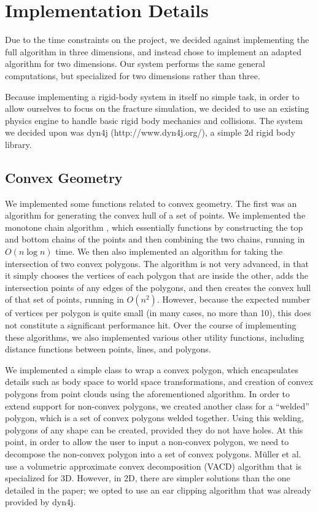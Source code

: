 \documentclass[tog]{acmsiggraph}
\begin{document}
\section{Implementation Details}

Due to the time constraints on the project, we decided against
implementing the full algorithm in three dimensions, and instead chose
to implement an adapted algorithm for two dimensions. Our system
performs the same general computations, but specialized for two
dimensions rather than three.

Because implementing a rigid-body system in itself no simple task, in
order to allow ourselves to focus on the fracture simulation, we
decided to use an existing physics engine to handle basic rigid body
mechanics and collisions. The system we decided upon was dyn4j
(http://www.dyn4j.org/), a simple 2d rigid body library.

\subsection{Convex Geometry}

We implemented some functions related to convex geometry. The first
was an algorithm for generating the convex hull of a set of points. We
implemented the monotone chain algorithm \cite{Andrew79}, which
essentially functions by constructing the top and bottom chains of the
points and then combining the two chains, running in $O(n \log n)$
time. We then also implemented an algorithm for taking the
intersection of two convex polygons. The algorithm is not very
advanced, in that it simply chooses the vertices of each polygon that
are inside the other, adds the intersection points of any edges of the
polygons, and then creates the convex hull of that set of points,
running in $O(n^2)$. However, because the expected number of vertices
per polygon is quite small (in many cases, no more than 10), this does
not constitute a significant performance hit. Over the course of
implementing these algorithms, we also implemented various other
utility functions, including distance functions between points, lines,
and polygons.

We implemented a simple class to wrap a convex polygon, which
encapsulates details such as body space to world space
transformations, and creation of convex polygons from point clouds
using the aforementioned algorithm. In order to extend support for
non-convex polygons, we created another class for a ``welded''
polygon, which is a set of convex polygons welded together. Using this
welding, polygons of any shape can be created, provided they do not
have holes. At this point, in order to allow the user to input a
non-convex polygon, we need to decompose the non-convex polygon into a
set of convex polygons. M\"uller et al. use a volumetric approximate
convex decomposition (VACD) algorithm that is specialized for
3D. However, in 2D, there are simpler solutions than the one detailed
in the paper; we opted to use an ear clipping algorithm that was
already provided by dyn4j.
\end{document}
